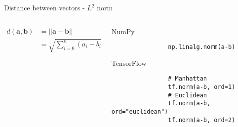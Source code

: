\documentclass[handout]{beamer}
\begin{document}
\begin{frame}[fragile]{Distance between vectors - $L^2$ norm}
    \begin{columns}
        \begin{column}{0.5\textwidth}
    \Large
    \begin{align*}
        d(\boldsymbol{a}, \boldsymbol{b}) &= ||\boldsymbol{a} - \boldsymbol{b}||\\
                                          &= \sqrt{\sum_{i=0}^n (a_{i} - b_{i})^2}
    \end{align*}
        \end{column}
        \begin{column}{0.5\textwidth}
            \begin{alertblock}{NumPy}
                \begin{lstlisting}
                np.linalg.norm(a-b)
                \end{lstlisting}
            \end{alertblock}
            \begin{alertblock}{TensorFlow}
                \begin{lstlisting}
                # Manhattan
                tf.norm(a-b, ord=1)
                # Euclidean
                tf.norm(a-b, ord="euclidean")
                tf.norm(a-b, ord=2)
                \end{lstlisting}
            \end{alertblock}
        \end{column}
    \end{columns}
\end{frame}


\end{document}
